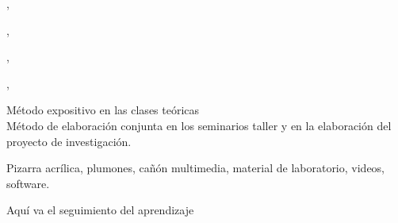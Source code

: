 \documentclass[a4paper,8pt]{article}
\begin{document}
\begin{contenidos}
\cite{Stroustrup2013}, \cite{Deitel2013} 


\nextUnidad{\ALAlgorithmicStrategies}
\nextCapitulo{\ALAlgorithmicStrategies}
\nextTema{\ALAlgorithmicStrategiesTopicBrute}
\nextTema{\ALAlgorithmicStrategiesTopicGreedy}
\nextTema{\ALAlgorithmicStrategiesTopicDivide}
\nextTema{\ALAlgorithmicStrategiesTopicRecursive}
\nextTema{\ALAlgorithmicStrategiesTopicDynamic}

\cite{Stroustrup2013}, \cite{Deitel2013} 


\nextUnidad{\ALBasicAnalysis}
\nextCapitulo{\ALBasicAnalysis}
\nextTema{\ALBasicAnalysisTopicDifferences}

\cite{Stroustrup2013}, \cite{Deitel2013} 


\nextUnidad{\ALFundamentalDataStructuresandAlgorithms}
\nextCapitulo{\ALFundamentalDataStructuresandAlgorithms}
\nextTema{\ALFundamentalDataStructuresandAlgorithmsTopicSimple}
\nextTema{\ALFundamentalDataStructuresandAlgorithmsTopicSequential}
\nextTema{\ALFundamentalDataStructuresandAlgorithmsTopicWorst}
\nextTema{\ALFundamentalDataStructuresandAlgorithmsTopicWorstOr}

\cite{Stroustrup2013}, \cite{Deitel2013} 





\end{contenidos}




\begin{estrategiasEnsenanza}
    \begin{metodos}
        Método expositivo en las clases teóricas \\
        Método de elaboración conjunta en los seminarios taller y en la elaboración del proyecto de investigación.
    \end{metodos}
    \begin{medios}
        Pizarra acrílica, plumones, cañón multimedia, material de laboratorio, videos, software.
    \end{medios}
    \begin{formasOrganizacion}
    \end{formasOrganizacion}
    \begin{programacion}
    \end{programacion}
    \begin{segumientoAprendizaje}
        Aquí va el seguimiento del aprendizaje
    \end{segumientoAprendizaje}
\end{estrategiasEnsenanza}
\end{document}
